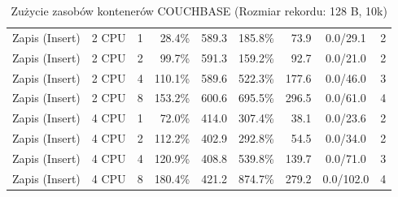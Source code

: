 \begin{table}[ht]
{\begin{tabular}{llcrrrrcc}
Zapis (Insert) & 2 CPU & 1 & 28.4\% & 589.3 & 185.8\% & 73.9 & 0.0/29.1 & 2 \\
Zapis (Insert) & 2 CPU & 2 & 99.7\% & 591.3 & 159.2\% & 92.7 & 0.0/21.0 & 2 \\
Zapis (Insert) & 2 CPU & 4 & 110.1\% & 589.6 & 522.3\% & 177.6 & 0.0/46.0 & 3 \\
Zapis (Insert) & 2 CPU & 8 & 153.2\% & 600.6 & 695.5\% & 296.5 & 0.0/61.0 & 4 \\
Zapis (Insert) & 4 CPU & 1 & 72.0\% & 414.0 & 307.4\% & 38.1 & 0.0/23.6 & 2 \\
Zapis (Insert) & 4 CPU & 2 & 112.2\% & 402.9 & 292.8\% & 54.5 & 0.0/34.0 & 2 \\
Zapis (Insert) & 4 CPU & 4 & 120.9\% & 408.8 & 539.8\% & 139.7 & 0.0/71.0 & 3 \\
Zapis (Insert) & 4 CPU & 8 & 180.4\% & 421.2 & 874.7\% & 279.2 & 0.0/102.0 & 4 \\
\bottomrule
\end{tabular}%
}
\caption{Zużycie zasobów kontenerów COUCHBASE (Rozmiar rekordu: 128 B, 10k)}
\label{tab:resources_couchbase_small_10000}
\end{table}
